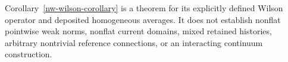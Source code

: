 \documentclass[11pt]{article}
\theoremstyle{remark}
\begin{document}
Corollary~\ref{nw-wilson-corollary} is a theorem for its explicitly
defined Wilson operator and deposited homogeneous averages.
It does not establish nonflat pointwise weak norms, nonflat current
domains, mixed retained histories, arbitrary nontrivial reference
connections, or an interacting continuum construction.
\end{document}
